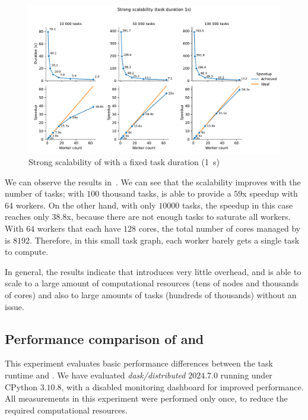 \begin{figure}[h]
	\centering
	\includegraphics[width=\textwidth]{imgs/hq/charts/scalability-fixed-task-duration}
	\caption{Strong scalability of \hyperqueue{} with a fixed task duration (\SI{1}{\second})}
	\label{fig:hq-scalability-fixed-task-duration}
\end{figure}

We can observe the results in~. We can see that the scalability improves
with the number of tasks; with $100$ thousand tasks, \hyperqueue{} is
able to provide a $59$x speedup with $64$ workers. On the other
hand, with only $10000$ tasks, the speedup in this case reaches only
$38.8$x, because there are not enough tasks to saturate all workers. With
$64$ workers that each have $128$ cores, the total number of
cores managed by \hq{} is $8192$. Therefore, in this small task
graph, each worker barely gets a single task to compute.

In general, the results indicate that \hyperqueue{} introduces very little overhead, and
is able to scale to a large amount of computational resources (tens of nodes and thousands of
cores) and also to large amounts of tasks (hundreds of thousands) without an issue.

\subsection{Performance comparison of \dask{} and \hq{}}
\label{sec:hq-exp-dask}
This experiment evaluates basic performance differences between the \dask{} task
runtime and \hyperqueue{}. We have evaluated \emph{dask/distributed}
$2024.7.0$ running under CPython $3.10.8$, with a disabled monitoring
dashboard for improved performance. All measurements in this experiment were performed only once,
to reduce the required computational resources.


